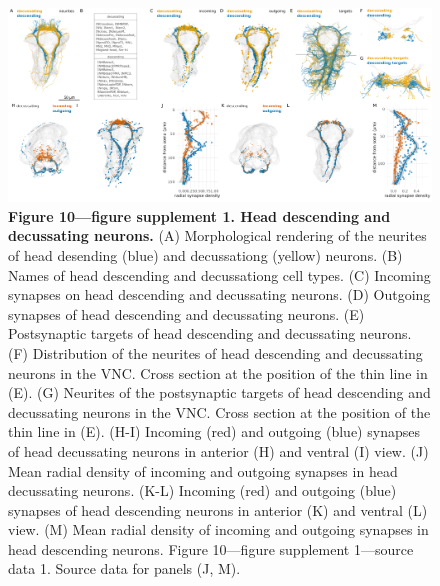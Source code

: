\documentclass[
  11pt,
]{article}
\begin{document}
\begin{figure}[H]

{\centering \includegraphics[width=1\textwidth,height=\textheight]{Figures/Figure10_fig_suppl1.png}

}

\caption{\textbf{Figure 10---figure supplement 1. Head descending and
decussating neurons.} (A) Morphological rendering of the neurites of
head desending (blue) and decussationg (yellow) neurons. (B) Names of
head descending and decussationg cell types. (C) Incoming synapses on
head descending and decussating neurons. (D) Outgoing synapses of head
descending and decussating neurons. (E) Postsynaptic targets of head
descending and decussating neurons. (F) Distribution of the neurites of
head descending and decussating neurons in the VNC. Cross section at the
position of the thin line in (E). (G) Neurites of the postsynaptic
targets of head descending and decussating neurons in the VNC. Cross
section at the position of the thin line in (E). (H-I) Incoming (red)
and outgoing (blue) synapses of head decussating neurons in anterior (H)
and ventral (I) view. (J) Mean radial density of incoming and outgoing
synapses in head decussating neurons. (K-L) Incoming (red) and outgoing
(blue) synapses of head descending neurons in anterior (K) and ventral
(L) view. (M) Mean radial density of incoming and outgoing synapses in
head descending neurons. Figure 10---figure supplement 1---source data
1. Source data for panels (J, M).}

\end{figure}%
\end{document}
